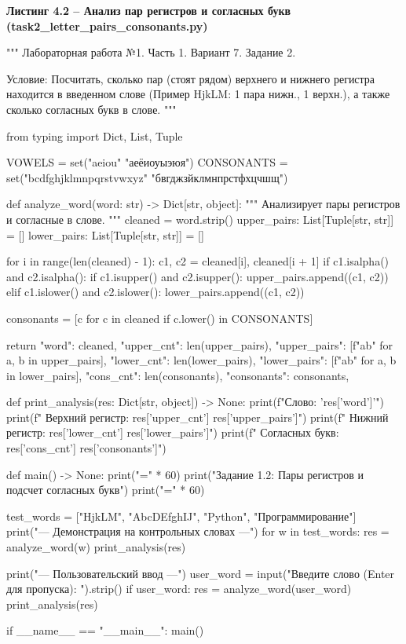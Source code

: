 \documentclass[14pt,a4paper]{extarticle}
\newcommand{\listingtitle}[1]{%
  \par\vspace{8pt}%
  \noindent\hspace*{1.25cm}\textbf{#1}\par\vspace{2pt}%
}
\begin{document}
\listingtitle{Листинг 4.2 -- Анализ пар регистров и согласных букв (task2\_letter\_pairs\_consonants.py)}
\begin{CodeListing}
"""
Лабораторная работа №1. Часть 1.
Вариант 7. Задание 2.

Условие:
Посчитать, сколько пар (стоят рядом) верхнего и нижнего регистра находится
в введенном слове (Пример HjkLM: 1 пара нижн., 1 верхн.),
а также сколько согласных букв в слове.
"""

from typing import Dict, List, Tuple

VOWELS = set("aeiou" "аеёиоуыэюя")
CONSONANTS = set("bcdfghjklmnpqrstvwxyz" "бвгджзйклмнпрстфхцчшщ")


def analyze_word(word: str) -> Dict[str, object]:
    """
    Анализирует пары регистров и согласные в слове.
    """
    cleaned = word.strip()
    upper_pairs: List[Tuple[str, str]] = []
    lower_pairs: List[Tuple[str, str]] = []

    for i in range(len(cleaned) - 1):
        c1, c2 = cleaned[i], cleaned[i + 1]
        if c1.isalpha() and c2.isalpha():
            if c1.isupper() and c2.isupper():
                upper_pairs.append((c1, c2))
            elif c1.islower() and c2.islower():
                lower_pairs.append((c1, c2))

    consonants = [c for c in cleaned if c.lower() in CONSONANTS]

    return {
        "word": cleaned,
        "upper_cnt": len(upper_pairs),
        "upper_pairs": [f"{a}{b}" for a, b in upper_pairs],
        "lower_cnt": len(lower_pairs),
        "lower_pairs": [f"{a}{b}" for a, b in lower_pairs],
        "cons_cnt": len(consonants),
        "consonants": consonants,
    }


def print_analysis(res: Dict[str, object]) -> None:
    print(f"Слово: '{res['word']}'")
    print(f"  Верхний регистр: {res['upper_cnt']} {res['upper_pairs']}")
    print(f"  Нижний регистр:  {res['lower_cnt']} {res['lower_pairs']}")
    print(f"  Согласных букв: {res['cons_cnt']} {res['consonants']}\n")


def main() -> None:
    print("=" * 60)
    print("Задание 1.2: Пары регистров и подсчет согласных букв")
    print("=" * 60)

    test_words = ["HjkLM", "AbcDEfghIJ", "Python", "Программирование"]
    print("\n--- Демонстрация на контрольных словах ---")
    for w in test_words:
        res = analyze_word(w)
        print_analysis(res)

    print("--- Пользовательский ввод ---")
    user_word = input("Введите слово (Enter для пропуска): ").strip()
    if user_word:
        res = analyze_word(user_word)
        print_analysis(res)


if __name__ == "__main__":
    main()
\end{CodeListing}
\end{document}
